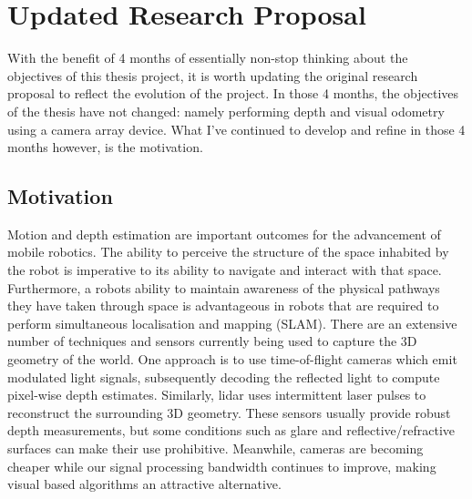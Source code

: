 \documentclass[openany]{book}
\begin{document}
\section{Updated Research Proposal}

With the benefit of 4 months of essentially non-stop thinking about the objectives of this thesis project, it is worth updating the original research proposal to reflect the evolution of the project. In those 4 months, the objectives of the thesis have not changed: namely performing depth and visual odometry using a camera array device. What I've continued to develop and refine in those 4 months however, is the motivation.

\subsection{Motivation}

Motion and depth estimation are important outcomes for the advancement of mobile robotics. The ability to perceive the structure of the space inhabited by the robot is imperative to its ability to navigate and interact with that space. Furthermore, a robots ability to maintain awareness of the physical pathways they have taken through space is advantageous in robots that are required to perform simultaneous localisation and mapping (SLAM). There are an extensive number of techniques and sensors currently being used to capture the 3D geometry of the world. One approach is to use time-of-flight cameras which emit modulated light signals, subsequently decoding the reflected light to compute pixel-wise depth estimates. Similarly, lidar uses intermittent laser pulses to reconstruct the surrounding 3D geometry. These sensors usually provide robust depth measurements, but some conditions such as glare and reflective/refractive surfaces can make their use prohibitive. Meanwhile, cameras are becoming cheaper while our signal processing bandwidth continues to improve, making visual based algorithms an attractive alternative.
\end{document}
